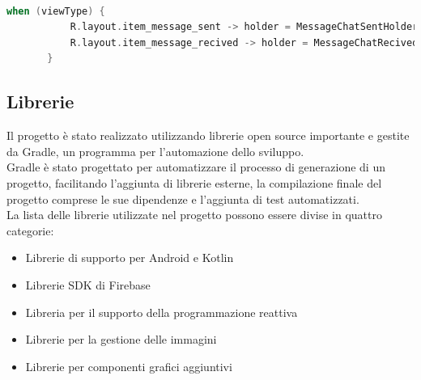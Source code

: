 \begin{lstlisting}[language=kotlin,caption={Logica della funzione onCreateViewHolder della chat}]

when (viewType) {
           R.layout.item_message_sent -> holder = MessageChatSentHolder(itemView = view, dateOfLastMessage = lastItem?.timestamp)
           R.layout.item_message_recived -> holder = MessageChatRecivedHolder(itemView = view, dateOfLastMessage = lastItem?.timestamp)
       }
   \end{lstlisting}



\subsection{Librerie}
Il progetto è stato realizzato utilizzando librerie open source importante e gestite da Gradle, un programma per l'automazione dello sviluppo.\\
Gradle è stato progettato per automatizzare il processo di generazione di un progetto, facilitando l'aggiunta di librerie esterne, la compilazione finale del progetto comprese le sue dipendenze e l'aggiunta di test automatizzati.\\
La lista delle librerie utilizzate nel progetto possono essere divise in quattro categorie:
\begin{itemize}
    \item Librerie di supporto per Android e Kotlin
    \item Librerie SDK di Firebase
    \item Libreria per il supporto della programmazione reattiva
    \item Librerie per la gestione delle immagini
    \item Librerie per componenti grafici aggiuntivi
\end{itemize}

